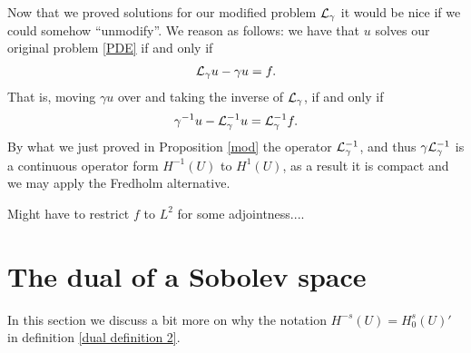 \documentclass[12pt]{article}
\theoremstyle{definition}
\newcommand{\red}[1]{{\color{red}#1}}
\begin{document}
Now that we proved solutions for our modified problem $\mathcal{L}_\gamma $ it would be nice if we could somehow ``unmodify''. We reason as follows: we have that $u$ solves our original problem  \eqref{PDE} if and only if
\begin{align*}
  \mathcal{L}_\gamma u - \gamma  u =f.
\end{align*}
That is, moving $\gamma  u$ over and taking the inverse of $\mathcal{L}_\gamma $, if and only if
\begin{align*}
  \gamma^{-1}u -\mathcal{L}_\gamma ^{-1} u = \mathcal{L}_\gamma ^{-1}f.
\end{align*}
By what we just proved in Proposition \ref{mod} the operator $\mathcal{L}_\gamma^{-1}$, and thus $ \gamma \mathcal{L}_\gamma ^{-1}$ is a continuous operator form $H^{-1}(U)$ to  $H^{1}(U)$, as a result it is compact and we may apply the Fredholm alternative.

\red{Might have to restrict $f$ to  $L^2$ for some adjointness....}

\appendix
\section{The dual of a Sobolev space}\label{dual section}
In this section we discuss a bit more on why the notation $H^{-s}(U)=H_0^s(U)'$ in definition \ref{dual definition 2}.
\end{document}
